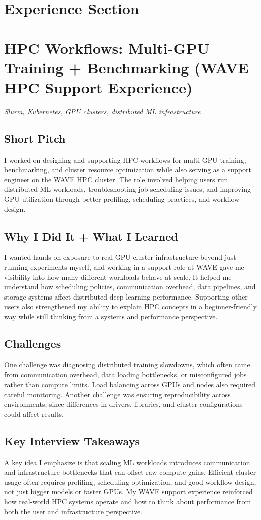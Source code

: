 \documentclass[11pt]{article}
\newcommand{\blue}[1]{\textcolor{myblue}{#1}}
\newcommand{\ProjectHeader}[2]{%
\section*{\textcolor{projectcolor}{#1}}%
\noindent\textit{#2}\par\vspace{0.4em}
}
\begin{document}
\section*{\blue{Experience Section}}
\ProjectHeader{HPC Workflows: Multi-GPU Training + Benchmarking (WAVE HPC Support Experience)}{Slurm, Kubernetes, GPU clusters, distributed ML infrastructure}

\subsection{Short Pitch}
I worked on designing and supporting HPC workflows for multi-GPU training, benchmarking, and cluster resource optimization while also serving as a support engineer on the WAVE HPC cluster. The role involved helping users run distributed ML workloads, troubleshooting job scheduling issues, and improving GPU utilization through better profiling, scheduling practices, and workflow design.

\subsection{Why I Did It + What I Learned}
I wanted hands-on exposure to real GPU cluster infrastructure beyond just running experiments myself, and working in a support role at WAVE gave me visibility into how many different workloads behave at scale. It helped me understand how scheduling policies, communication overhead, data pipelines, and storage systems affect distributed deep learning performance. Supporting other users also strengthened my ability to explain HPC concepts in a beginner-friendly way while still thinking from a systems and performance perspective.

\subsection{Challenges}
One challenge was diagnosing distributed training slowdowns, which often came from communication overhead, data loading bottlenecks, or misconfigured jobs rather than compute limits. Load balancing across GPUs and nodes also required careful monitoring. Another challenge was ensuring reproducibility across environments, since differences in drivers, libraries, and cluster configurations could affect results.

\subsection{Key Interview Takeaways}
A key idea I emphasize is that scaling ML workloads introduces communication and infrastructure bottlenecks that can offset raw compute gains. Efficient cluster usage often requires profiling, scheduling optimization, and good workflow design, not just bigger models or faster GPUs. My WAVE support experience reinforced how real-world HPC systems operate and how to think about performance from both the user and infrastructure perspective.
\end{document}
